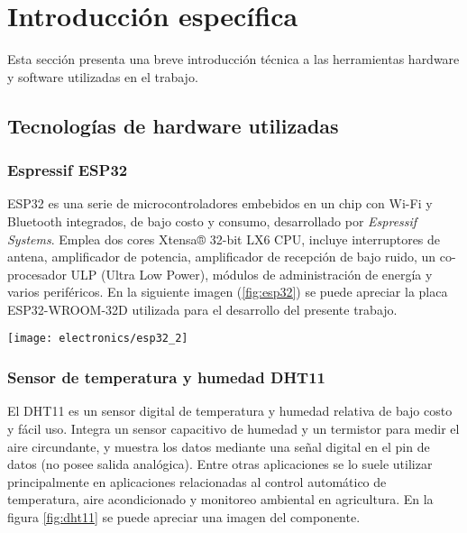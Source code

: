 
\chapter{Introducción específica} %

\label{Chapter2}

Esta sección presenta una breve introducción técnica a las herramientas hardware y software utilizadas en el trabajo.

\section{Tecnologías de hardware utilizadas}

\subsection{Espressif ESP32}


ESP32 \cite{ESP32} es una serie de microcontroladores embebidos en un chip con Wi-Fi y Bluetooth integrados, de bajo costo y consumo, desarrollado por \textit{Espressif Systems}. Emplea dos cores Xtensa® 32-bit LX6 CPU, incluye interruptores de antena, amplificador de potencia, amplificador de recepción de bajo ruido, un co-procesador ULP (Ultra Low Power), módulos de administración de energía y varios periféricos.
En la siguiente imagen (\ref{fig:esp32}) se puede apreciar la placa ESP32-WROOM-32D \cite{ESP32_wroom_32d_datasheet} utilizada para el desarrollo del presente trabajo.

\begin{center}
   \texttt{[image: electronics/esp32\_2]}
   \label{fig:esp32}
\end{center}


\subsection{Sensor de temperatura y humedad DHT11}

El DHT11 \cite{DHT11_datasheet} es un sensor digital de temperatura y humedad relativa de bajo costo y fácil uso. Integra un sensor capacitivo de humedad y un termistor para medir el aire circundante, y muestra los datos mediante una señal digital en el pin de datos (no posee salida analógica). Entre otras aplicaciones se lo suele utilizar principalmente en aplicaciones relacionadas al control automático de temperatura, aire acondicionado y monitoreo ambiental en agricultura. En la figura \ref{fig:dht11} se puede apreciar una imagen del componente.

